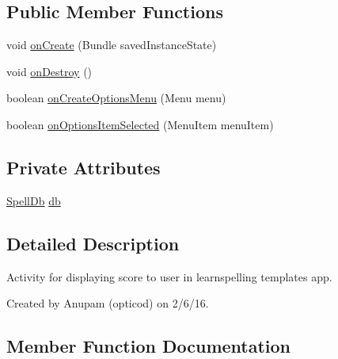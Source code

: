 \subsection*{Public Member Functions}
\begin{DoxyCompactItemize}
\item 
void \hyperlink{classorg_1_1buildmlearn_1_1learnspellings_1_1activities_1_1LastActivity_a51977040d904af8933ad93115f92e736}{on\+Create} (Bundle saved\+Instance\+State)
\item 
void \hyperlink{classorg_1_1buildmlearn_1_1learnspellings_1_1activities_1_1LastActivity_afa5b2fef7a8057605696704b91edf714}{on\+Destroy} ()
\item 
boolean \hyperlink{classorg_1_1buildmlearn_1_1learnspellings_1_1activities_1_1LastActivity_a2b5f9ab3972696b3f2bd5fd92f547729}{on\+Create\+Options\+Menu} (Menu menu)
\item 
boolean \hyperlink{classorg_1_1buildmlearn_1_1learnspellings_1_1activities_1_1LastActivity_affbb2e8abe870534872eb92f4951a990}{on\+Options\+Item\+Selected} (Menu\+Item menu\+Item)
\end{DoxyCompactItemize}
\subsection*{Private Attributes}
\begin{DoxyCompactItemize}
\item 
\hyperlink{classorg_1_1buildmlearn_1_1learnspellings_1_1data_1_1SpellDb}{Spell\+Db} \hyperlink{classorg_1_1buildmlearn_1_1learnspellings_1_1activities_1_1LastActivity_addc4fe89425042bd71d80f575986cb3f}{db}
\end{DoxyCompactItemize}


\subsection{Detailed Description}
Activity for displaying score to user in learnspelling template\textquotesingle{}s app. 

Created by Anupam (opticod) on 2/6/16. 

\subsection{Member Function Documentation}
